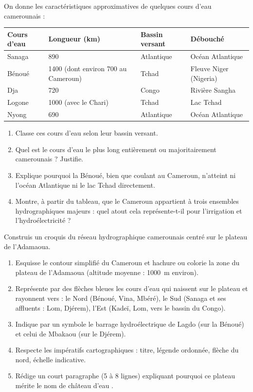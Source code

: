 \documentclass[11pt]{article}
\begin{document}
\begin{exercice}
On donne les caractéristiques approximatives de quelques cours d'eau camerounais :

\begin{center}
\begin{tabularx}{\linewidth}{|l|X|X|X|}
\hline
\rowcolor{popblueL} \textbf{Cours d'eau} & \textbf{Longueur (km)} & \textbf{Bassin versant} & \textbf{Débouché} \\
\hline
Sanaga & 890 & Atlantique & Océan Atlantique \\
\hline
Bénoué & 1400 (dont environ 700 au Cameroun) & Tchad & Fleuve Niger (Nigeria) \\
\hline
Dja & 720 & Congo & Rivière Sangha \\
\hline
Logone & 1000 (avec le Chari) & Tchad & Lac Tchad \\
\hline
Nyong & 690 & Atlantique & Océan Atlantique \\
\hline
\end{tabularx}
\end{center}

\begin{enumerate}
\item Classe ces cours d'eau selon leur bassin versant.
\item Quel est le cours d'eau le plus long entièrement ou majoritairement camerounais ? Justifie.
\item Explique pourquoi la Bénoué, bien que coulant au Cameroun, n'atteint ni l'océan Atlantique ni le lac Tchad directement.
\item Montre, à partir du tableau, que le Cameroun appartient à trois ensembles hydrographiques majeurs : quel atout cela représente-t-il pour l'irrigation et l'hydroélectricité ?
\end{enumerate}
\end{exercice}

\begin{exercice}
Construis un croquis du réseau hydrographique camerounais centré sur le plateau de l'Adamaoua.
\begin{enumerate}
\item Esquisse le contour simplifié du Cameroun et hachure ou colorie la zone du plateau de l'Adamaoua (altitude moyenne : \SI{1000}{m} environ).
\item Représente par des flèches bleues les cours d'eau qui naissent sur le plateau et rayonnent vers : le Nord (Bénoué, Vina, Mbéré), le Sud (Sanaga et ses affluents : Lom, Djérem), l'Est (Kadeï, Lom, vers le bassin du Congo).
\item Indique par un symbole le barrage hydroélectrique de Lagdo (sur la Bénoué) et celui de Mbakaou (sur le Djérem).
\item Respecte les impératifs cartographiques : titre, légende ordonnée, flèche du nord, échelle indicative.
\item Rédige un court paragraphe (5 à 8 lignes) expliquant pourquoi ce plateau mérite le nom de \og château d'eau \fg.
\end{enumerate}
\end{exercice}
\end{document}
